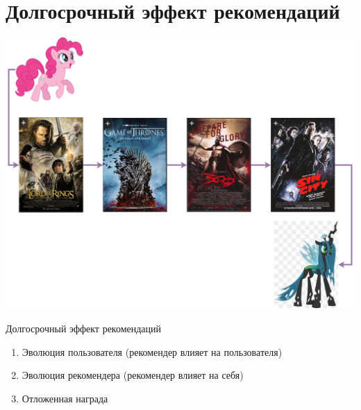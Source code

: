 \documentclass[11pt,aspectratio=169,handout]{beamer}
\begin{document}
\section{Долгосрочный эффект рекомендаций}

\begin{frame}{}

\begin{center}
\includegraphics[scale=0.22]{images/longterm.png}
\end{center}

\end{frame}

\begin{frame}{Долгосрочный эффект рекомендаций}

\begin{tcolorbox}[colback=info!5,colframe=info!80,title=]
\begin{enumerate}[<+->]
\item Эволюция пользователя (рекомендер влияет на пользователя)
\item Эволюция рекомендера (рекомендер влияет на себя)
\item Отложенная награда
\end{enumerate}
\end{tcolorbox}

\end{frame}
\end{document}
